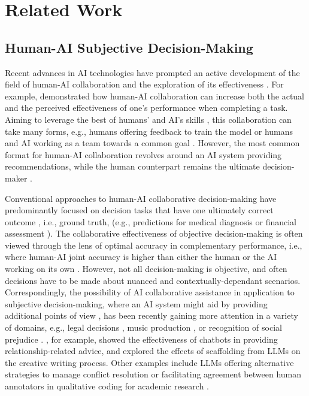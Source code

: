 \section{Related Work}
\subsection{Human-AI Subjective Decision-Making}

Recent advances in AI technologies have prompted an active development of the field of human-AI collaboration and the exploration of its effectiveness \cite{dakuo.et.al,arous.et.al, cai2019hello}. For example, \citet{Jacobsen.et.al} demonstrated how human-AI collaboration can increase both the actual and the perceived effectiveness of one's performance when completing a task.
Aiming to leverage the best of humans' and AI's skills \cite{steyvers2023three,jarrahi2018artificial}, this collaboration can take many forms, e.g., humans offering feedback to train the model \cite{dellermann2021future} or humans and AI working as a team towards a common goal \cite{zhang2021ideal, kelly2023capturing}. However, the most common format for human-AI collaboration revolves around an AI system providing recommendations, while the human counterpart remains the ultimate decision-maker \cite{guerdan2023ground, zhang2020effect, fogliato2022goes}. 

Conventional approaches to human-AI collaborative decision-making have predominantly focused on decision tasks that have one ultimately correct outcome \cite{lai2021towards}, i.e., ground truth, (e.g., predictions for medical diagnosis \cite{cai2019hello} or financial assessment \cite{binns2018s}). 
The collaborative effectiveness of objective decision-making is often viewed through the lens of optimal accuracy in complementary performance, i.e., where human-AI joint accuracy is higher than either the human or the AI working on its own \cite{bansal2021does, hemmer2021human, donahuecomplementarity}. 
However, not all decision-making is objective, and often decisions have to be made about nuanced and contextually-dependant scenarios.  
Correspondingly, the possibility of AI collaborative assistance in application to subjective decision-making, where an AI system might aid by providing additional points of view \cite{hemmer2021human}, has been recently gaining more attention \cite{Schaekerman.et.al,Inkpen.et.al} in a variety of domains, e.g., legal decisions \cite{hayashi.et.al}, music production \cite{nicholls2018collaborative}, or recognition of social prejudice \cite{ferguson2023something}. \citet{vowels2024}, for example, showed the effectiveness of chatbots in providing relationship-related advice, and \citet{dhillon.creative} explored the effects of scaffolding from LLMs on the creative writing process. Other examples include LLMs offering alternative strategies to manage conflict resolution \cite{Conflict.resolution} or facilitating agreement between human annotators in qualitative coding for academic research \cite{gao2024collabcoder}.

